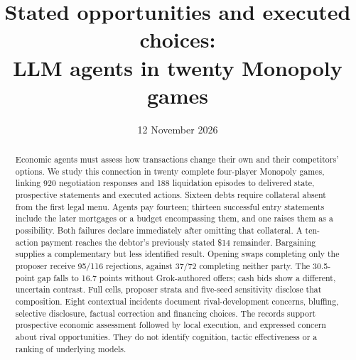 \documentclass[11pt,letterpaper]{article}
\title{Stated opportunities and executed choices:\\LLM agents in twenty Monopoly games}
\author{}
\date{12 November 2026}
\begin{document}




\maketitle
\begin{abstract}
Economic agents must assess how transactions change their own and their competitors' options. We study this connection in twenty complete four-player Monopoly games, linking 920 negotiation responses and 188 liquidation episodes to delivered state, prospective statements and executed actions. Sixteen debts require collateral absent from the first legal menu. Agents pay fourteen; thirteen successful entry statements include the later mortgages or a budget encompassing them, and one raises them as a possibility. Both failures declare immediately after omitting that collateral. A ten-action payment reaches the debtor's previously stated \$14 remainder. Bargaining supplies a complementary but less identified result. Opening swaps completing only the proposer receive 95/116 rejections, against 37/72 completing neither party. The 30.5-point gap falls to 16.7 points without Grok-authored offers; cash bids show a different, uncertain contrast. Full cells, proposer strata and five-seed sensitivity disclose that composition. Eight contextual incidents document rival-development concerns, bluffing, selective disclosure, factual correction and financing choices. The records support prospective economic assessment followed by local execution, and expressed concern about rival opportunities. They do not identify cognition, tactic effectiveness or a ranking of underlying models.
\end{abstract}






\begingroup\small\setlength{\bibsep}{1pt}

\endgroup
\clearpage\appendix

\end{document}
